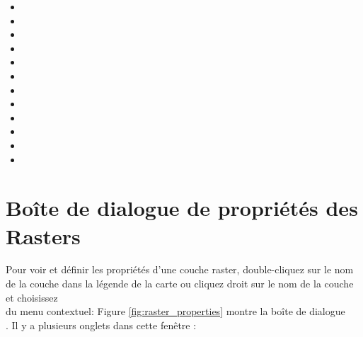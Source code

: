 \begin{itemize}[label=--]
\item {}
\item {}
\item {}
\item {}
\item {}
\item {}
\item {}
\item {}
\item {}
\item {}
\item {}
\item {}
\end{itemize}

\section{Boîte de dialogue de propriétés des Rasters}\label{label_rasterprop}

Pour voir et définir les propriétés d'une couche raster, double-cliquez sur le nom de la couche dans la légende de la carte ou cliquez droit sur le nom de la couche et choisissez\\  du menu
contextuel:  Figure
\ref{fig:raster_properties} montre la boîte de dialogue\\ . Il y a plusieurs onglets dans cette fenêtre :

